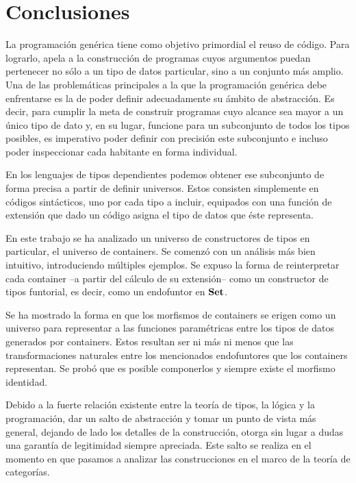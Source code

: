 \chapter*{Conclusiones}

La programación genérica tiene como objetivo primordial el reuso de código. Para lograrlo, apela a la construcción de programas cuyos argumentos puedan pertenecer no sólo a un tipo de datos particular, sino a un conjunto más amplio.   
Una de las problemáticas principales a la que la programación genérica debe enfrentarse es la de poder definir adecuadamente su ámbito de abstracción. Es decir, para cumplir la meta de construir programas cuyo alcance sea mayor a un único tipo de dato y, en su lugar, funcione para un subconjunto de todos los tipos posibles, es imperativo poder definir con precisión este subconjunto e incluso poder inspeccionar cada habitante en forma individual.

En los lenguajes de tipos dependientes podemos obtener ese subconjunto de forma precisa a partir de definir universos. Estos consisten simplemente en códigos sintácticos, uno por cada tipo a incluir, equipados con una función de extensión que dado un código asigna el tipo de datos que éste representa.

En este trabajo se ha analizado un universo de constructores de tipos en particular, el universo de containers. Se comenzó con un análisis más bien intuitivo, introduciendo múltiples ejemplos. Se expuso la forma de reinterpretar cada container --a partir del cálculo de su extensión-- como un constructor de tipos funtorial, es decir, como un endofuntor en $\mathbf{Set}$.

Se ha mostrado la forma en que los morfismos de containers se erigen como un universo para representar a las funciones paramétricas entre los tipos de datos generados por containers. Estos resultan ser ni más ni menos que las transformaciones naturales entre los mencionados endofuntores que los containers representan. Se probó que es posible componerlos y siempre existe el morfismo identidad.

Debido a la fuerte relación existente entre la teoría de tipos, la lógica y la programación, dar un salto de abstracción y tomar un punto de vista más general, dejando de lado los detalles de la construcción, otorga sin lugar a dudas una garantía de legitimidad siempre apreciada. Este salto se realiza en el momento en que pasamos a analizar las construcciones en el marco de la teoría de categorías.

